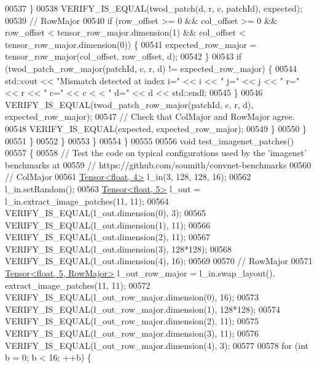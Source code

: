 \begin{DoxyCode}
00537             \}
00538             VERIFY\_IS\_EQUAL(twod\_patch(d, r, c, patchId), expected);
00539             \textcolor{comment}{// RowMajor}
00540             \textcolor{keywordflow}{if} (row\_offset >= 0 && col\_offset >= 0 && row\_offset < tensor\_row\_major.dimension(1) && 
      col\_offset < tensor\_row\_major.dimension(0)) \{
00541               expected\_row\_major = tensor\_row\_major(col\_offset, row\_offset, d);
00542             \}
00543             \textcolor{keywordflow}{if} (twod\_patch\_row\_major(patchId, c, r, d) != expected\_row\_major) \{
00544               std::cout << \textcolor{stringliteral}{"Mismatch detected at index i="} << i << \textcolor{stringliteral}{" j="} << j << \textcolor{stringliteral}{" r="} << r << \textcolor{stringliteral}{" c="} << c <
      < \textcolor{stringliteral}{" d="} << d << std::endl;
00545             \}
00546             VERIFY\_IS\_EQUAL(twod\_patch\_row\_major(patchId, c, r, d), expected\_row\_major);
00547             \textcolor{comment}{// Check that ColMajor and RowMajor agree.}
00548             VERIFY\_IS\_EQUAL(expected, expected\_row\_major);
00549           \}
00550         \}
00551       \}
00552     \}
00553   \}
00554 \}
00555 
00556 \textcolor{keywordtype}{void} test\_imagenet\_patches()
00557 \{
00558   \textcolor{comment}{// Test the code on typical configurations used by the 'imagenet' benchmarks at}
00559   \textcolor{comment}{// https://github.com/soumith/convnet-benchmarks}
00560   \textcolor{comment}{// ColMajor}
00561   \hyperlink{class_eigen_1_1_tensor}{Tensor<float, 4>} l\_in(3, 128, 128, 16);
00562   l\_in.setRandom();
00563   \hyperlink{class_eigen_1_1_tensor}{Tensor<float, 5>} l\_out = l\_in.extract\_image\_patches(11, 11);
00564   VERIFY\_IS\_EQUAL(l\_out.dimension(0), 3);
00565   VERIFY\_IS\_EQUAL(l\_out.dimension(1), 11);
00566   VERIFY\_IS\_EQUAL(l\_out.dimension(2), 11);
00567   VERIFY\_IS\_EQUAL(l\_out.dimension(3), 128*128);
00568   VERIFY\_IS\_EQUAL(l\_out.dimension(4), 16);
00569 
00570   \textcolor{comment}{// RowMajor}
00571   \hyperlink{class_eigen_1_1_tensor}{Tensor<float, 5, RowMajor>} l\_out\_row\_major = l\_in.swap\_layout().
      extract\_image\_patches(11, 11);
00572   VERIFY\_IS\_EQUAL(l\_out\_row\_major.dimension(0), 16);
00573   VERIFY\_IS\_EQUAL(l\_out\_row\_major.dimension(1), 128*128);
00574   VERIFY\_IS\_EQUAL(l\_out\_row\_major.dimension(2), 11);
00575   VERIFY\_IS\_EQUAL(l\_out\_row\_major.dimension(3), 11);
00576   VERIFY\_IS\_EQUAL(l\_out\_row\_major.dimension(4), 3);
00577 
00578   \textcolor{keywordflow}{for} (\textcolor{keywordtype}{int} b = 0; b < 16; ++b) \{

\end{DoxyCode}
